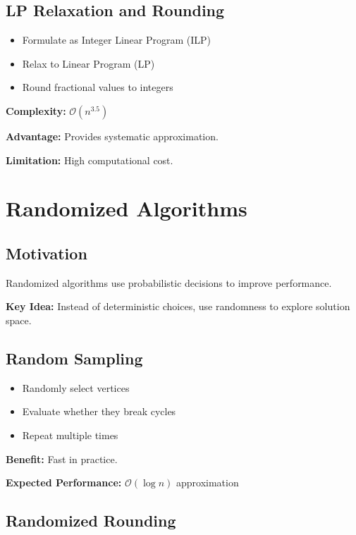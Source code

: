 \documentclass[10pt,a4paper]{report}
\theoremstyle{definition}
\newcommand{\bigO}[1]{\mathcal{O}\!\left(#1\right)}
\begin{document}
\subsection{LP Relaxation and Rounding}

\begin{itemize}
  \item Formulate as Integer Linear Program (ILP)
  \item Relax to Linear Program (LP)
  \item Round fractional values to integers
\end{itemize}

\textbf{Complexity:} $\bigO{n^{3.5}}$

\textbf{Advantage:} Provides systematic approximation.

\textbf{Limitation:} High computational cost.

\section{Randomized Algorithms}

\subsection{Motivation}

Randomized algorithms use probabilistic decisions to improve performance.

\textbf{Key Idea:} Instead of deterministic choices, use randomness to explore solution space.

\subsection{Random Sampling}

\begin{itemize}
  \item Randomly select vertices
  \item Evaluate whether they break cycles
  \item Repeat multiple times
\end{itemize}

\textbf{Benefit:} Fast in practice.

\textbf{Expected Performance:} $\mathcal{O}(\log n)$ approximation

\subsection{Randomized Rounding}
\end{document}
